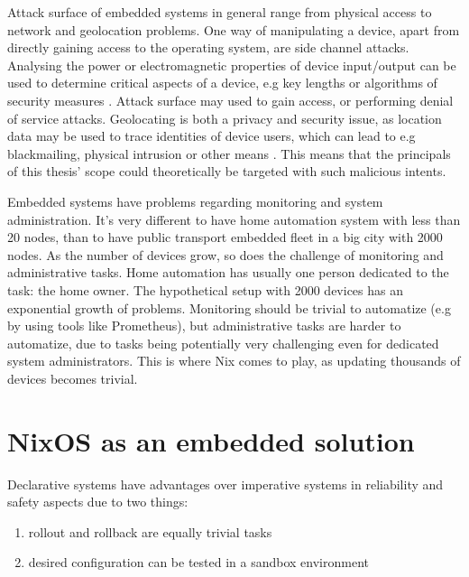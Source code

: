 Attack surface of embedded systems in general range from physical
access to network and geolocation problems. One way of manipulating a
device, apart from directly gaining access to the operating system,
are side channel attacks. Analysing the power or electromagnetic
properties of device input/output can be used to determine critical
aspects of a device, e.g key lengths or algorithms of security
measures \cite{fysarakis2014embedded, serpanos2013security}. Attack
surface may used to gain access, or performing denial of service
attacks. Geolocating is both a privacy and security issue, as location
data may be used to trace identities of device users, which can lead
to e.g blackmailing, physical intrusion or other means
\cite{fysarakis2014embedded}. This means that the principals of this
thesis' scope could theoretically be targeted with such malicious
intents.

Embedded systems have problems regarding monitoring and system
administration. It's very different to have home automation system
with less than 20 nodes, than to have public transport embedded fleet
in a big city with 2000 nodes. As the number of devices grow, so does
the challenge of monitoring and administrative tasks. Home automation
has usually one person dedicated to the task: the home owner. The
hypothetical setup with 2000 devices has an exponential growth of
problems. Monitoring should be trivial to automatize (e.g by using
tools like Prometheus), but administrative tasks are harder to
automatize, due to tasks being potentially very challenging even for
dedicated system administrators. This is where Nix comes to play, as
updating thousands of devices becomes trivial.


\section{NixOS as an embedded solution} \label{nixosassolution}

Declarative systems have advantages over imperative systems in
reliability and safety aspects due to two things:

\begin{enumerate}

\item rollout and rollback are equally trivial tasks
\item desired configuration can be tested in a sandbox environment
  
\end{enumerate}


